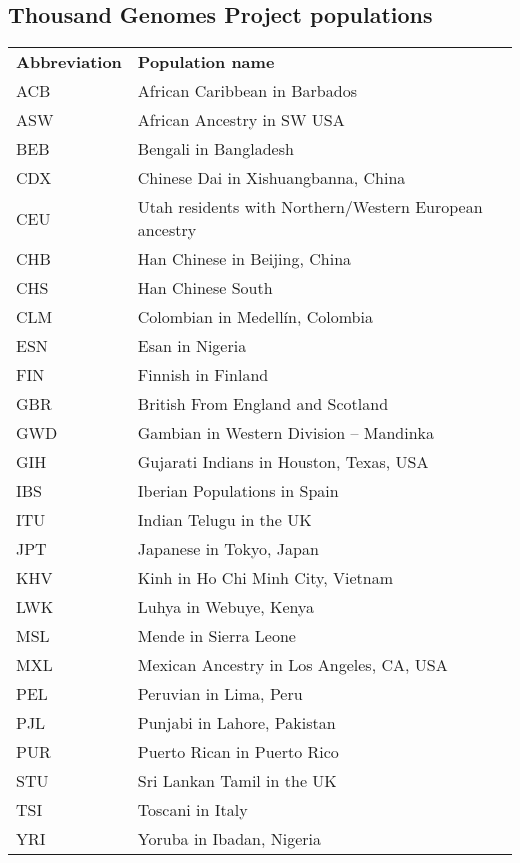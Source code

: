 \newpage
\subsection*{Thousand Genomes Project populations}

\begin{table}[!h]
\hspace{1.0cm}
\begin{tabular}{l l r}

\textbf{Abbreviation} & \textbf{Population name}\\ [1ex]
\textsc{ACB} & African Caribbean in Barbados\\ [1ex]
\textsc{ASW} & African Ancestry in SW USA \\ [1ex]
\textsc{BEB} & Bengali in Bangladesh\\ [1ex]
\textsc{CDX} & Chinese Dai in Xishuangbanna, China\\ [1ex]
\textsc{CEU} & Utah residents with Northern/Western European ancestry\\ [1ex]
\textsc{CHB} & Han Chinese in Beijing, China\\ [1ex]
\textsc{CHS} & Han Chinese South\\ [1ex]
\textsc{CLM} & Colombian in Medell\'{i}n, Colombia\\ [1ex]
\textsc{ESN} & Esan in Nigeria\\ [1ex]
\textsc{FIN} & Finnish in Finland\\ [1ex]
\textsc{GBR} & British From England and Scotland\\ [1ex]
\textsc{GWD} & Gambian in Western Division -- Mandinka\\ [1ex]
\textsc{GIH} & Gujarati Indians in Houston, Texas, USA\\ [1ex]
\textsc{IBS} & Iberian Populations in Spain\\ [1ex]
\textsc{ITU} & Indian Telugu in the UK\\ [1ex]
\textsc{JPT} & Japanese in Tokyo, Japan\\ [1ex]
\textsc{KHV} & Kinh in Ho Chi Minh City, Vietnam\\ [1ex]
\textsc{LWK} & Luhya in Webuye, Kenya\\ [1ex]
\textsc{MSL} & Mende in Sierra Leone\\ [1ex]
\textsc{MXL} & Mexican Ancestry in Los Angeles, CA, USA\\ [1ex]
\textsc{PEL} & Peruvian in Lima, Peru\\ [1ex]
\textsc{PJL} & Punjabi in Lahore, Pakistan\\ [1ex]
\textsc{PUR} & Puerto Rican in Puerto Rico\\ [1ex]
\textsc{STU} & Sri Lankan Tamil in the UK\\ [1ex]
\textsc{TSI} & Toscani in Italy\\ [1ex]
\textsc{YRI} & Yoruba in Ibadan, Nigeria\\ [1ex]

\end{tabular}
\end{table}

\normalsize







